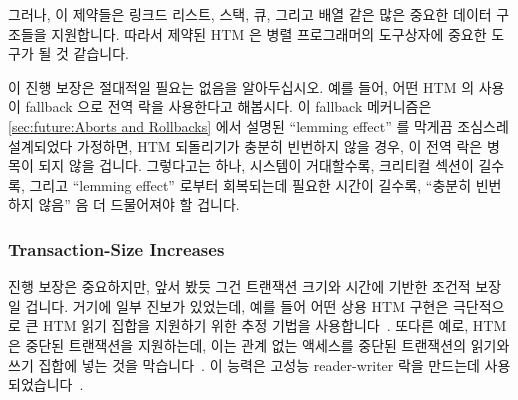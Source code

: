 그러나, 이 제약들은 링크드 리스트, 스택, 큐, 그리고 배열 같은 많은 중요한
데이터 구조들을 지원합니다.
따라서 제약된 HTM 은 병렬 프로그래머의 도구상자에 중요한 도구가 될 것 같습니다.

이 진행 보장은 절대적일 필요는 없음을 알아두십시오.
예를 들어, 어떤 HTM 의 사용이 fallback 으로 전역 락을 사용한다고 해봅시다.
이 fallback 메커니즘은
\cref{sec:future:Aborts and Rollbacks}
에서 설명된 ``lemming effect'' 를 막게끔 조심스레 설계되었다 가정하면, HTM
되돌리기가 충분히 빈번하지 않을 경우, 이 전역 락은 병목이 되지 않을 겁니다.
그렇다고는 하나, 시스템이 거대할수록, 크리티컬 섹션이 길수록, 그리고 ``lemming
effect'' 로부터 회복되는데 필요한 시간이 길수록, ``충분히 빈번하지 않음'' 음 더
드물어져야 할 겁니다.

\iffalse

Nevertheless, these constraints support a number of important data structures,
including linked lists, stacks, queues, and arrays.
Constrained HTM therefore seems likely to become an important tool in
the parallel programmer's toolbox.

Note that these forward-progress guarantees need not be absolute.
For example, suppose that a use of HTM uses a global lock as fallback.
Assuming that the fallback mechanism has been carefully designed to
avoid the ``lemming effect'' discussed in
\cref{sec:future:Aborts and Rollbacks},
then if HTM rollbacks are sufficiently infrequent, the global lock
will not be a bottleneck.
That said, the larger the system, the longer the critical sections,
and the longer the time required to recover from the ``lemming effect'',
the more rare ``sufficiently infrequent'' needs to be.

\fi

\subsubsection{Transaction-Size Increases}
\label{sec:future:Transaction-Size Increases}

진행 보장은 중요하지만, 앞서 봤듯 그건 트랜잭션 크기와 시간에 기반한 조건적
보장일 겁니다.
거기에 일부 진보가 있었는데, 예를 들어 어떤 상용 HTM 구현은 극단적으로 큰 HTM
읽기 집합을 지원하기 위한 추정 기법을 사용합니다~\cite{RaviRajwar2012TSX}.
또다른 예로,  HTM 은 중단된 트랜잭션을 지원하는데, 이는 관계 없는
액세스를 중단된 트랜잭션의 읽기와 쓰기 집합에 넣는 것을
막습니다~\cite{Le:2015:TMS:3266491.3266500}.
이 능력은 고성능 reader-writer 락을 만드는데
사용되었습니다~\cite{PascalFelber2016rwlockElision}.

